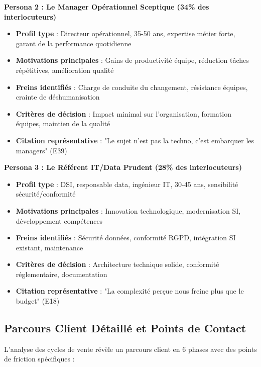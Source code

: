 \textbf{Persona 2 : Le Manager Opérationnel Sceptique (34\% des interlocuteurs)}
\begin{itemize}
    \item \textbf{Profil type} : Directeur opérationnel, 35-50 ans, expertise métier forte, garant de la performance quotidienne
    \item \textbf{Motivations principales} : Gains de productivité équipe, réduction tâches répétitives, amélioration qualité
    \item \textbf{Freins identifiés} : Charge de conduite du changement, résistance équipes, crainte de déshumanisation
    \item \textbf{Critères de décision} : Impact minimal sur l'organisation, formation équipes, maintien de la qualité
    \item \textbf{Citation représentative} : "Le sujet n'est pas la techno, c'est embarquer les managers" (E39)
\end{itemize}

\textbf{Persona 3 : Le Référent IT/Data Prudent (28\% des interlocuteurs)}
\begin{itemize}
    \item \textbf{Profil type} : DSI, responsable data, ingénieur IT, 30-45 ans, sensibilité sécurité/conformité
    \item \textbf{Motivations principales} : Innovation technologique, modernisation SI, développement compétences
    \item \textbf{Freins identifiés} : Sécurité données, conformité RGPD, intégration SI existant, maintenance
    \item \textbf{Critères de décision} : Architecture technique solide, conformité réglementaire, documentation
    \item \textbf{Citation représentative} : "La complexité perçue nous freine plus que le budget" (E18)
\end{itemize}

\subsection{Parcours Client Détaillé et Points de Contact}

L'analyse des cycles de vente révèle un parcours client en 6 phases avec des points de friction spécifiques :

